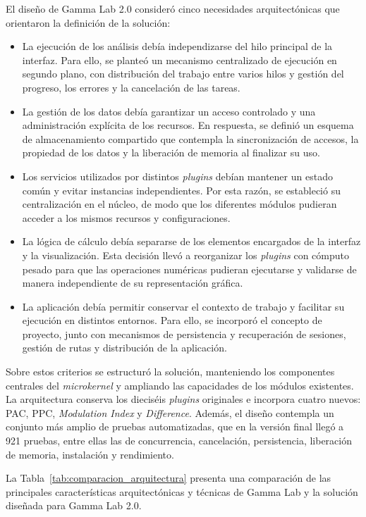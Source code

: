 \documentclass[12pt,letterpaper,oneside]{article}
\begin{document}
El diseño de Gamma Lab 2.0 consideró cinco necesidades arquitectónicas que orientaron la definición de la solución:

\begin{itemize}
  \item La ejecución de los análisis debía independizarse del hilo principal de la interfaz. Para ello, se planteó un mecanismo centralizado de ejecución en segundo plano, con distribución del trabajo entre varios hilos y gestión del progreso, los errores y la cancelación de las tareas.
  \item La gestión de los datos debía garantizar un acceso controlado y una administración explícita de los recursos. En respuesta, se definió un esquema de almacenamiento compartido que contempla la sincronización de accesos, la propiedad de los datos y la liberación de memoria al finalizar su uso.
  \item Los servicios utilizados por distintos \textit{plugins} debían mantener un estado común y evitar instancias independientes. Por esta razón, se estableció su centralización en el núcleo, de modo que los diferentes módulos pudieran acceder a los mismos recursos y configuraciones.
  \item La lógica de cálculo debía separarse de los elementos encargados de la interfaz y la visualización. Esta decisión llevó a reorganizar los \textit{plugins} con cómputo pesado para que las operaciones numéricas pudieran ejecutarse y validarse de manera independiente de su representación gráfica.
  \item La aplicación debía permitir conservar el contexto de trabajo y facilitar su ejecución en distintos entornos. Para ello, se incorporó el concepto de proyecto, junto con mecanismos de persistencia y recuperación de sesiones, gestión de rutas y distribución de la aplicación.
\end{itemize}

Sobre estos criterios se estructuró la solución, manteniendo los componentes centrales del \textit{microkernel} y ampliando las capacidades de los módulos existentes. La arquitectura conserva los dieciséis \textit{plugins} originales e incorpora cuatro nuevos: PAC, PPC, \textit{Modulation Index} y \textit{Difference}. Además, el diseño contempla un conjunto más amplio de pruebas automatizadas, que en la versión final llegó a 921 pruebas, entre ellas las de concurrencia, cancelación, persistencia, liberación de memoria, instalación y rendimiento.

La Tabla~\ref{tab:comparacion_arquitectura} presenta una comparación de las principales características arquitectónicas y técnicas de Gamma Lab y la solución diseñada para Gamma Lab 2.0.
\end{document}
